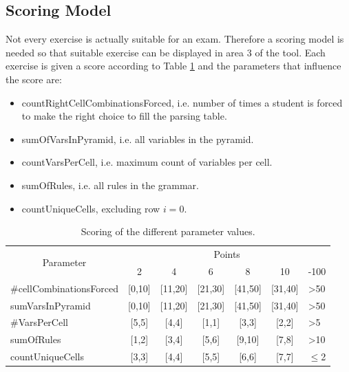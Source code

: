 \clearpage

\subsection{Scoring Model} \label{scoringModel}
Not every exercise is actually suitable for an exam. Therefore a scoring model is needed so that suitable exercise can be displayed in area 3 of the tool. Each exercise is given a score according to Table \ref{scoring} and the parameters that influence the score are:
\begin{itemize}
	\item countRightCellCombinationsForced, i.e. number of times a student is forced to make the right choice to fill the parsing table.
	\item sumOfVarsInPyramid, i.e. all variables in the pyramid.
	\item countVarsPerCell, i.e. maximum count of variables per cell.
	\item sumOfRules, i.e. all rules in the grammar.
	\item countUniqueCells, excluding row $i=0$. 
\end{itemize}
\begin{table}[H]
	\centering
	\begin{tabular}{|l|c|c|c|c|c|l|}
		\hline
		\multicolumn{1}{|c|}{\multirow{2}{*}{Parameter}} & \multicolumn{6}{c|}{Points}                                                          \\ \cline{2-7} 
		\multicolumn{1}{|c|}{}		& 2          & 4           & 6           & 8           & 10          & -100            \\ \hline
		\#cellCombinationsForced      & {[}0,10{]} & {[}11,20{]} & {[}21,30{]} & {[}41,50{]} & {[}31,40{]} & \textgreater 50 \\ \hline
		sumVarsInPyramid            & {[}0,10{]} & {[}11,20{]} & {[}21,30{]} & {[}41,50{]} & {[}31,40{]} & \textgreater 50 \\ \hline
		\#VarsPerCell              & {[}5,5{]}  & {[}4,4{]}   & {[}1,1{]}   & {[}3,3{]}   & {[}2,2{]}   & \textgreater 5  \\ \hline
		sumOfRules              & {[}1,2{]}  & {[}3,4{]}   & {[}5,6{]}   & {[}9,10{]}  & {[}7,8{]}   & \textgreater 10 \\ \hline		countUniqueCells & {[}3,3{]}  & {[}4,4{]}   & {[}5,5{]}   & {[}6,6{]}  & {[}7,7{]}   & $\leq$2  \\ \hline
	\end{tabular}
	\caption{Scoring of the different parameter values.}
	\label{scoring}
\end{table}



